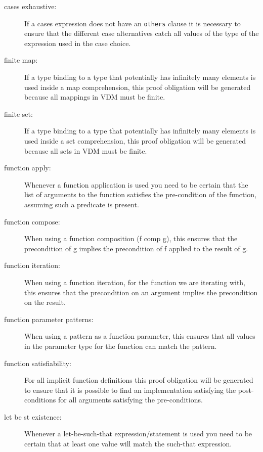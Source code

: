 \begin{description}

\item[cases exhaustive:] If a cases expression does not have an
  \texttt{others} clause it is necessary to ensure that the
  different case alternatives catch all values of the type of the
  expression used in the case choice.

\item[finite map:] If a type binding to a type that potentially has
  infinitely many elements is used inside a map comprehension, this
  proof obligation will be generated because all mappings in VDM must be finite.

\item[finite set:] If a type binding to a type that potentially has
  infinitely many elements is used inside a set comprehension, this
  proof obligation will be generated because all sets in VDM must be finite.

\item[function apply:] Whenever a function application is used you need to be
  certain that the list of arguments to the function satisfies the
  pre-condition of the function, assuming such a predicate is present.

\item[function compose:] When using a function composition (f comp g), this ensures
    that the precondition of g implies the precondition of f applied to the result
    of g.

\item[function iteration:] When using a function iteration, for the function we
    are iterating with, this ensures that the precondition on an argument implies
    the precondition on the result.

\item[function parameter patterns:] When using a pattern as a function
    parameter, this ensures that all values in the parameter type for the
    function can match the pattern.

\item[function satisfiability:] For all implicit function definitions
  this proof obligation will be generated to ensure that it is
  possible to find an implementation satisfying the post-conditions for all
  arguments satisfying the pre-conditions.

\item[let be st existence:] Whenever a let-be-such-that
  expression/statement is used you need to be certain that at least one value
  will match the such-that expression.


\end{description}
